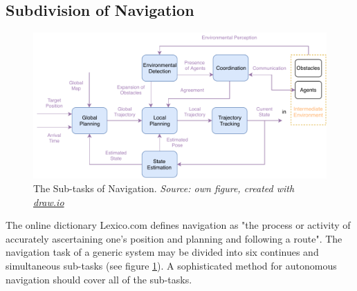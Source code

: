 \subsection{Subdivision of Navigation}

\begin{figure}
  \centering
  \includegraphics[width=\textwidth]{Figures/draw.io/sub-tasks_of_navigation}
  \decoRule
  \caption[The Sub-tasks of Navigation]{The Sub-tasks of Navigation. \textit{Source: own figure, created with \href{https://www.draw.io/}{draw.io}}}
  \label{fig:sub-tasks_of_navigation}
\end{figure}

The online dictionary Lexico.com \cite{Lexico.com-navigation} defines navigation as 
"the process or activity of accurately ascertaining one's position and planning and following a route".
The navigation task of a generic system may be divided into six continues and simultaneous sub-tasks (see figure \ref{fig:sub-tasks_of_navigation}).
A sophisticated method for autonomous navigation should cover all of the sub-tasks.

